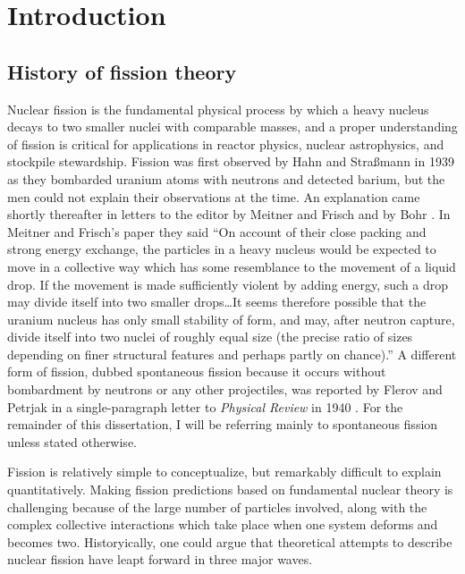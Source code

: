 \chapter{Introduction}\label{chap:Intro}

\section{History of fission theory}
Nuclear fission is the fundamental physical process by which a heavy nucleus decays to two smaller nuclei with comparable masses, and a proper understanding of fission is critical for applications in reactor physics, nuclear astrophysics, and stockpile stewardship. Fission was first observed by Hahn and Stra\ss{}mann in 1939 \cite{Hahn1939} as they bombarded uranium atoms with neutrons and detected barium, but the men could not explain their observations at the time. An explanation came shortly thereafter in letters to the editor by Meitner and Frisch \cite{Meitner1939b} and by Bohr \cite{Bohr1939a}. In Meitner and Frisch's paper they said ``On account of their close packing and strong energy exchange, the particles in a heavy nucleus would be expected to move in a collective way which has some resemblance to the movement of a liquid drop. If the movement is made sufficiently violent by adding energy, such a drop may divide itself into two smaller drops\dots It seems therefore possible that the uranium nucleus has only small stability of form, and may, after neutron capture, divide itself into two nuclei of roughly equal size (the precise ratio of sizes depending on finer structural features and perhaps partly on chance).'' A different form of fission, dubbed spontaneous fission because it occurs without bombardment by neutrons or any other projectiles, was reported by Flerov and Petrjak in a single-paragraph letter to \textit{Physical Review} in 1940 \cite{Flerov1940}. For the remainder of this dissertation, I will be referring mainly to spontaneous fission unless stated otherwise.


Fission is relatively simple to conceptualize, but remarkably difficult to explain quantitatively. Making fission predictions based on fundamental nuclear theory is challenging because of the large number of particles involved, along with the complex collective interactions which take place when one system deforms and becomes two. Historyically, one could argue that theoretical attempts to describe nuclear fission have leapt forward in three major waves.

